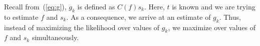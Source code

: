 Recall from~(\ref{eq:g}), $g_k$ is defined as $C(f)s_k$.  Here, $t$ is
known and we are trying to estimate $f$ and $s_k$.  As a 
consequence, we arrive at an estimate of $g_k$.  Thus,
instead of maximizing the likelihood over values of $g_k$, we maximize over
values of $f$ and $s_k$ simultaneously. 


